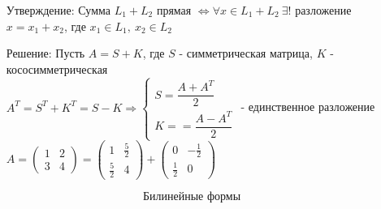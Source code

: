 \documentclass[12pt, letterpaper, twoside]{article}
\begin{document}
\begin{enumerate}
        \item[Утверждение:] Сумма $L_1 + L_2$ прямая $\Leftrightarrow \forall x \in L_1 + L_2\ \exists!$ разложение $x = x_1 + x_2$, где $x_1 \in L_1,\ x_2 \in L_2$
        \item[Решение:] Пусть $A = S + K$, где $S$ - симметрическая матрица, $K$ - кососимметрическая\\
        $A^T = S^T + K^T = S - K\Rightarrow \begin{cases}
            S = \dfrac{A + A^T}{2}\\
            K = =\dfrac{A - A^T}{2}
        \end{cases}$ - единственное разложение\\
        $A = \begin{pmatrix}
            1 & 2\\
            3 & 4
        \end{pmatrix} = \begin{pmatrix}
            1 & \frac{5}{2}\\
            \frac{5}{2} & 4
        \end{pmatrix} + \begin{pmatrix}
            0 & -\frac{1}{2}\\
            \frac{1}{2} & 0
        \end{pmatrix}$
    \end{enumerate}
        \[\text{Билинейные формы}\]
\end{document}
